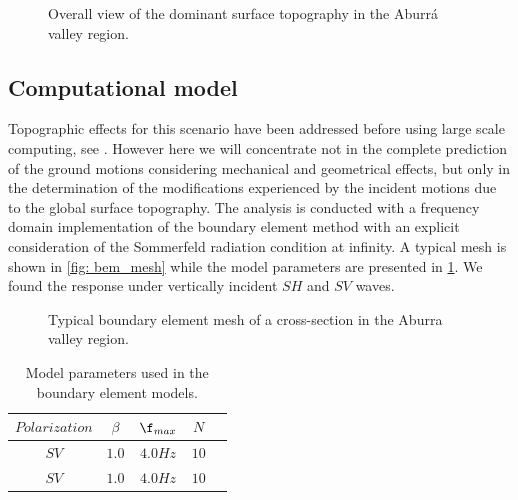 \documentclass[11pt,letterpaper]{article}
\begin{document}
\begin{figure}[H]
	\centering
	\caption{\small Overall view of the dominant surface topography in the Aburrá valley region.}
	\label{fig:medallo}
\end{figure}


%
\subsection*{Computational model}
%
Topographic effects for this scenario have been addressed before using large scale computing, see \cite{restrepo2016effects}. However here we will concentrate not in the complete prediction of the ground motions considering mechanical and geometrical effects, but only in the determination of the modifications experienced by the incident motions due to the global surface topography. The analysis is conducted with a frequency domain implementation of the boundary element method \citep{banerjeeboundary} with an explicit consideration of the Sommerfeld radiation condition at infinity. A typical mesh is shown in \cref{fig: bem_mesh} while the model parameters are presented in \cref{tab:bem_params}. We found the response under vertically incident $SH$ and $SV$ waves.


\begin{figure}[H]
	\center
	\caption{\small Typical boundary element mesh of a cross-section in the Aburra valley region.}
 \label{fig:bem_mesh}
\end{figure}


\begin{table}[H]
\begin{center}
    \begin{tabular} { | c | c | c | c | p{10cm} |}
    \hline
     $Polarization$ & $\beta$ & $\f_{max}$ & $N$ \\ \hline
    $SV$ & $1.0$ & $4.0 Hz$ & $10$  \\ \hline
    $SV$ & $1.0$ & $4.0 Hz$ & $10$  \\ \hline
   \end{tabular}
\end{center}
\caption {Model parameters used in the boundary element models.} \label{tab:bem_params} 
\end{table}
\end{document}

